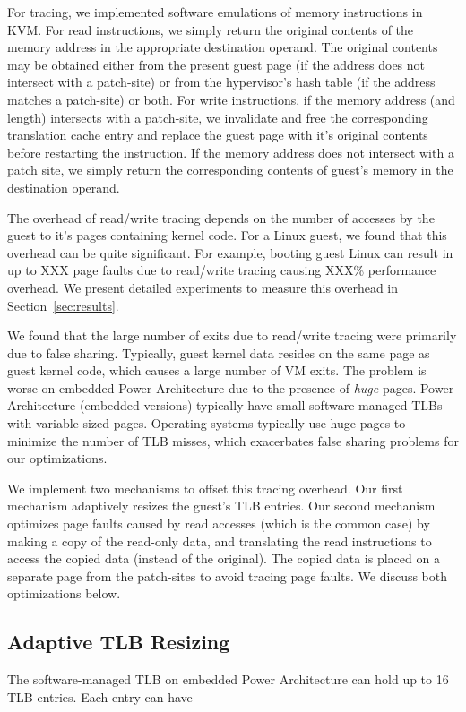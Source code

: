 \documentclass[10pt,twocolumn]{article}
\begin{document}
For tracing, we implemented software emulations of memory instructions in KVM.
For read instructions, we simply return the original contents of the memory
address in the appropriate destination
operand. The original contents may be obtained either from the present guest
page (if the address does not intersect with a patch-site) or from the hypervisor's
hash table (if the address matches a patch-site) or both.
For write instructions, if the memory address (and length) intersects with a patch-site,
we invalidate and free the corresponding translation cache
entry and replace the guest page with it's original contents before
restarting the instruction. If the memory address does not intersect with a patch
site, we simply return the corresponding contents of guest's memory in the destination
operand.

The overhead of read/write tracing depends on the number of accesses by the guest
to it's pages containing kernel code. For a Linux guest, we found that this overhead
can be quite significant. For example, booting guest Linux can result in
up to XXX page faults due to read/write tracing causing XXX\% performance overhead.
We present detailed experiments to measure this overhead in Section~\ref{sec:results}.

We found that the large number of exits due to read/write tracing were primarily
due to false sharing. Typically, guest kernel data resides on the same page as
guest kernel code, which causes a large number of VM exits. The problem is
worse on embedded Power Architecture due to the presence of {\em huge} pages.
Power Architecture (embedded versions) typically have small software-managed
TLBs with variable-sized pages. Operating systems typically use huge pages to
minimize the number of TLB misses, which exacerbates false sharing problems for
our optimizations.

We implement two mechanisms to offset this tracing overhead. Our first mechanism
adaptively resizes the guest's TLB entries. Our second mechanism optimizes page faults
caused by read accesses (which is the common case) by making a copy of
the read-only data, and translating the read instructions
to access the copied data (instead of the original). The copied data is placed on
a separate page from the patch-sites to avoid tracing page faults. We discuss
both optimizations below.

\subsection{Adaptive TLB Resizing}
The software-managed TLB on embedded Power Architecture can hold up to 16 TLB
entries. Each entry can have 
\end{document}
